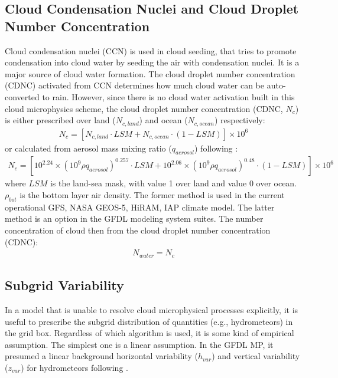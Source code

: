 \documentclass[letterpaper,titlepage,10pt]{article}
\numberwithin{equation}{section}
\begin{document}

\subsection{Cloud Condensation Nuclei and Cloud Droplet Number Concentration}

Cloud condensation nuclei (CCN) is used in cloud seeding, that tries to promote condensation into cloud water by seeding the air with condensation nuclei. It is a major source of cloud water formation. The cloud droplet number concentration (CDNC) activated from CCN determines how much cloud water can be auto-converted to rain. However, since there is no cloud water activation built in this cloud microphysics scheme, the cloud droplet number concentration (CDNC, $N_c$) is either prescribed over land ($N_{c,land}$) and ocean ($N_{c,ocean}$) respectively:
\begin{gather}
    N_c = \left[N_{c,land} \cdot LSM + N_{c,ocean} \cdot \left(1 - LSM \right) \right] \times 10^6
\end{gather}
or calculated from aerosol mass mixing ratio ($q_{aerosol}$) following \citet{boucher1995thes}:
\begin{gather}
    N_c = \left[10^{2.24} \times \left(10^9 \rho q_{aerosol} \right)^{0.257} \cdot LSM + 10^{2.06} \times \left(10^9 \rho q_{aerosol} \right)^{0.48} \cdot \left(1 - LSM \right) \right] \times 10^{6}
\end{gather}
where $LSM$ is the land-sea mask, with value 1 over land and value 0 over ocean. $\rho_{bot}$ is the bottom layer air density. The former method is used in the current operational GFS, NASA GEOS-5, HiRAM, IAP climate model. The latter method is an option in the GFDL modeling system suites. The number concentration of cloud then from the cloud droplet number concentration (CDNC):
\begin{gather}
	N_{water} = N_c
\end{gather}


\subsection{Subgrid Variability}

In a model that is unable to resolve cloud microphysical processes explicitly, it is useful to prescribe the subgrid distribution of quantities (e.g., hydrometeors) in the grid box. Regardless of which algorithm is used, it is some kind of empirical assumption. The simplest one is a linear assumption. In the GFDL MP, it presumed a linear background horizontal variability ($h_{var}$) and vertical variability ($z_{var}$) for hydrometeors following \citet{lin1994acla}.
\end{document}
